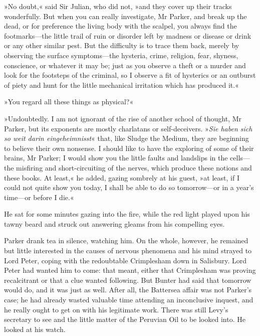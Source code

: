 »No doubt,« said Sir Julian, who did not, »and they cover up their tracks wonderfully. But when you can really investigate, Mr Parker, and break up the dead, or for preference the living body with the scalpel, you always find the footmarks\allowbreak---\allowbreak the little trail of ruin or disorder left by madness or disease or drink or any other similar pest. But the difficulty is to trace them back, merely by observing the surface symptoms\allowbreak---\allowbreak the hysteria, crime, religion, fear, shyness, conscience, or whatever it may be; just as you observe a theft or a murder and look for the footsteps of the criminal, so I observe a fit of hysterics or an outburst of piety and hunt for the little mechanical irritation which has produced it.«

»You regard all these things as physical?«

»Undoubtedly. I am not ignorant of the rise of another school of thought, Mr Parker, but its exponents are mostly charlatans or self-deceivers. »\textit{Sie haben sich so weit darin eingeheimnisst}« that, like Sludge the Medium, they are beginning to believe their own nonsense. I should like to have the exploring of some of their brains, Mr Parker; I would show you the little faults and landslips in the cells\allowbreak---\allowbreak the misfiring and short-circuiting of the nerves, which produce these notions and these books. At least,« he added, gazing sombrely at his guest, »at least, if I could not quite show you today, I shall be able to do so tomorrow\allowbreak---\allowbreak or in a year's time\allowbreak---\allowbreak or before I die.«

He sat for some minutes gazing into the fire, while the red light played upon his tawny beard and struck out answering gleams from his compelling eyes.

Parker drank tea in silence, watching him. On the whole, however, he remained but little interested in the causes of nervous phenomena and his mind strayed to Lord Peter, coping with the redoubtable Crimplesham down in Salisbury. Lord Peter had wanted him to come: that meant, either that Crimplesham was proving recalcitrant or that a clue wanted following. But Bunter had said that tomorrow would do, and it was just as well. After all, the Battersea affair was not Parker's case; he had already wasted valuable time attending an inconclusive inquest, and he really ought to get on with his legitimate work. There was still Levy's secretary to see and the little matter of the Peruvian Oil to be looked into. He looked at his watch.

